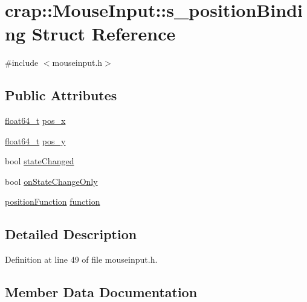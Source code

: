 \hypertarget{structcrap_1_1_mouse_input_1_1s__position_binding}{}\section{crap\+:\+:Mouse\+Input\+:\+:s\+\_\+position\+Binding Struct Reference}
\label{structcrap_1_1_mouse_input_1_1s__position_binding}


{\ttfamily \#include $<$mouseinput.\+h$>$}

\subsection*{Public Attributes}
\begin{DoxyCompactItemize}
\item 
\hyperlink{crap__types_8h_ac55f3ae81b5bc9053760baacf57e47f4}{float64\+\_\+t} \hyperlink{structcrap_1_1_mouse_input_1_1s__position_binding_af1f25bdf38525cebee5041bbfbdb1239}{pos\+\_\+x}
\item 
\hyperlink{crap__types_8h_ac55f3ae81b5bc9053760baacf57e47f4}{float64\+\_\+t} \hyperlink{structcrap_1_1_mouse_input_1_1s__position_binding_ad05b14a8fcc7b2e2f15923888b2683a2}{pos\+\_\+y}
\item 
bool \hyperlink{structcrap_1_1_mouse_input_1_1s__position_binding_a582ebaa42d7112f1703bba3150a57566}{state\+Changed}
\item 
bool \hyperlink{structcrap_1_1_mouse_input_1_1s__position_binding_adc14f5541941e3a2e6168b5cdb6f2c01}{on\+State\+Change\+Only}
\item 
\hyperlink{classcrap_1_1_mouse_input_aa2d296ac0bf7bf9f29c13377534bf919}{position\+Function} \hyperlink{structcrap_1_1_mouse_input_1_1s__position_binding_a31d531f0fd0ecfaf9c1d841632cf7deb}{function}
\end{DoxyCompactItemize}


\subsection{Detailed Description}


Definition at line 49 of file mouseinput.\+h.



\subsection{Member Data Documentation}
\hypertarget{structcrap_1_1_mouse_input_1_1s__position_binding_a31d531f0fd0ecfaf9c1d841632cf7deb}{}
